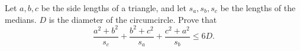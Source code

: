 Let $a, b, c$ be the side lengths of a triangle, and let $s_a, s_b, s_c$ be the lengths of the medians. $D$ is the diameter of the circumcircle. Prove that
\[ \frac{a^2 + b^2}{s_c} + \frac{b^2 + c^2}{s_a} + \frac{c^2 + a^2}{s_b} \leq 6D. \]
